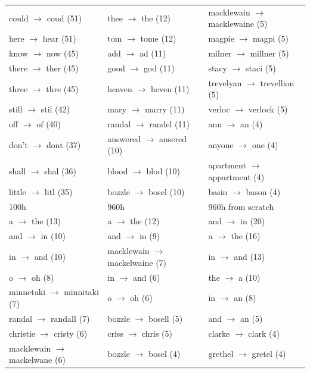 \documentclass{article}
\begin{document}
\begin{table}
\begin{tabular}{l|l|l}
could $\rightarrow$ coud (51) &thee $\rightarrow$ the (12) &macklewain $\rightarrow$ macklewaine (5) \\
here $\rightarrow$ hear (51) &tom $\rightarrow$ tome (12) &magpie $\rightarrow$ magpi (5) \\
know $\rightarrow$ now (45) &add $\rightarrow$ ad (11) &milner $\rightarrow$ millner (5) \\
there $\rightarrow$ ther (45) &good $\rightarrow$ god (11) &stacy $\rightarrow$ staci (5) \\
three $\rightarrow$ thre (45) &heaven $\rightarrow$ heven (11) &trevelyan $\rightarrow$ trevellion (5) \\
still $\rightarrow$ stil (42) &mary $\rightarrow$ marry (11) &verloc $\rightarrow$ verlock (5) \\
off $\rightarrow$ of (40) &randal $\rightarrow$ randel (11) &ann $\rightarrow$ an (4) \\
don't $\rightarrow$ dont (37) &answered $\rightarrow$ ansered (10) &anyone $\rightarrow$ one (4) \\
shall $\rightarrow$ shal (36) &blood $\rightarrow$ blod (10) &apartment $\rightarrow$ appartment (4) \\
little $\rightarrow$ litl (35) &bozzle $\rightarrow$ bosel (10) &basin $\rightarrow$ bason (4) \\
\bottomrule
\midrule
100h \wvppbig{} \voxsz{} & 960h \wvppbig{} \voxsz{} & 960h \wvppbig{} from scratch  \\
\midrule
 a $\rightarrow$ the (13) & a $\rightarrow$ the (12) & and $\rightarrow$ in (20) \\
 and $\rightarrow$ in (10) & and $\rightarrow$ in (9) & a $\rightarrow$ the (16) \\
 in $\rightarrow$ and (10) & macklewain $\rightarrow$ mackelwaine (7) & in $\rightarrow$ and (13) \\
 o $\rightarrow$ oh (8) & in $\rightarrow$ and (6) & the $\rightarrow$ a (10) \\
 minnetaki $\rightarrow$ minnitaki (7) & o $\rightarrow$ oh (6) & in $\rightarrow$ an (8) \\
 randal $\rightarrow$ randall (7) & bozzle $\rightarrow$ bosell (5) & and $\rightarrow$ an (5) \\
 christie $\rightarrow$ cristy (6) & criss $\rightarrow$ chris (5) & clarke $\rightarrow$ clark (4) \\
 macklewain $\rightarrow$ mackelwane (6) & bozzle $\rightarrow$ bosel (4) & grethel $\rightarrow$ gretel (4) \\

\end{tabular}
\end{table}
\end{document}
